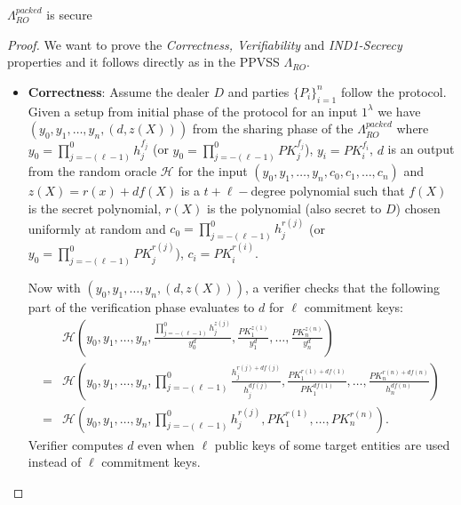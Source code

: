 \begin{theorem}
  $\Lambda_{RO}^{packed}$ is secure
\end{theorem}
\begin{proof}
  We want to prove the \textit{Correctness, Verifiability} and \textit{IND1-Secrecy} properties and it follows 
  directly as in the PPVSS $\Lambda_{RO}$.
  \begin{itemize}
    \item \textbf{Correctness}: Assume the dealer $D$ and parties $\{P_i\}_{i=1}^n$ follow the protocol. Given a 
      setup from initial phase of the protocol for an input $1^\lambda$ we have $(y_0,y_1,\dots,y_n,(d,z(X)))$ from 
      the sharing phase of the $\Lambda_{RO}^{packed}$ where 
      $y_0=\prod_{j=-(\ell-1)}^{0}h_j^{f_j}$ (or $y_0=\prod_{j=-(\ell-1)}^0PK_j^{f_j}$), $y_i=PK_i^{f_i}$, $d$ is an output 
      from the random oracle $\mathcal{H}$ for the input $(y_0,y_1,\dots,y_n,c_0,c_1,\dots,c_n)$ and $z(X)=r(x)+df(X)$ 
      is a $t+\ell-$degree polynomial such that $f(X)$ is the secret polynomial, $r(X)$ is the polynomial (also secret to $D$) 
      chosen uniformly at random and $c_0=\prod_{j=-(\ell-1)}^{0}h_j^{r(j)}$ (or $y_0=\prod_{j=-(\ell-1)}^0PK_j^{r(j)}$), $c_i=PK_i^{r(i)}$.\par 

      Now with $(y_0,y_1,\dots,y_n,(d,z(X)))$, a verifier checks that the following part of the verification phase evaluates to $d$ 
      for $\ell$ commitment keys:
      \begin{align*}
        &\mathcal{H}(y_0,y_1,\dots,y_n,\frac{\prod_{j=-(\ell-1)}^{0}h_j^{z(j)}}{y_0^d},\frac{PK_1^{z(1)}}{y_1^d},\dots,\frac{PK_n^{z(n)}}{y_n^d})\\
        =&\mathcal{H}(y_0,y_1,\dots,y_n,\prod_{j=-(\ell-1)}^{0}\frac{h_j^{r(j)+df(j)}}{h_j^{df(j)}},\frac{PK_1^{r(1)+df(1)}}{PK_1^{df(1)}},\dots,\frac{PK_n^{r(n)+df(n)}}{h_n^{df(n)}})\\
        =&\mathcal{H}(y_0,y_1,\dots,y_n,\prod_{j=-(\ell-1)}^{0}h_j^{r(j)},PK_1^{r(1)},\dots,PK_n^{r(n)}).
      \end{align*}
      Verifier computes $d$ even when $\ell$ public keys of some target entities are used instead of $\ell$ commitment 
      keys.\par 
      

\end{itemize}
\end{proof}
